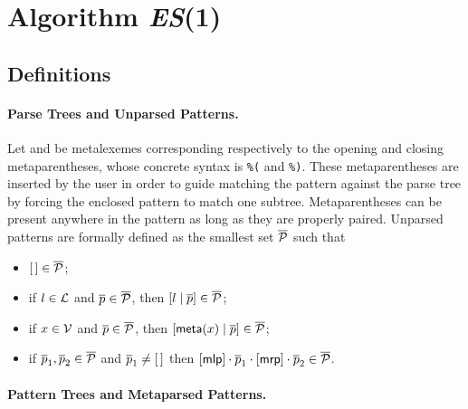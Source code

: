 
\section{Algorithm \textit{ES}(1)}
\label{es1}

\subsection{Definitions}
\label{es1:def}

\paragraph{Parse Trees and Unparsed Patterns.}

Let \mlp and \mrp be meta\-lexemes corresponding respectively to the
opening and closing meta\-parentheses, whose concrete syntax is
\texttt{\%(} and \texttt{\%)}. These meta\-parentheses are inserted by
the user in order to guide matching the pattern against the parse tree
by forcing the enclosed pattern to match one
subtree. Meta\-parentheses can be present anywhere in the pattern as
long as they are properly paired. Unparsed patterns are formally
defined as the smallest set \(\overline{\cal P}\) such that
\begin{itemize}

  \item \([\,] \in \overline{\cal P}\);

  \item if \(l \in {\cal L}\) and \(\overline{p} \in \overline{\cal
    P}\), then \([{l}\mid{\overline{p}}] \in \overline{\cal P}\);

  \item if \(x \in {\cal V}\) and \(\overline{p} \in \overline{\cal
    P}\), then \([{\textsf{meta}(x)}\mid{\overline{p}}] \in \overline{\cal
    P}\);

  \item if \(\overline{p}_1, \overline{p}_2 \in \overline{\cal P}\)
    and \(\overline{p}_1 \neq [\,]\) then \([\textsf{mlp}] \cdot \overline{p}_1
    \cdot [\textsf{mrp}] \cdot \overline{p}_2 \in \overline{\cal P}\). 

\end{itemize}

\paragraph{Pattern Trees and Meta\-parsed Patterns.}

